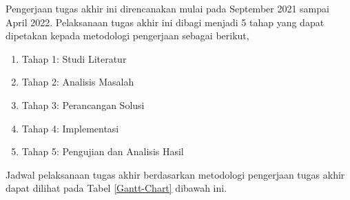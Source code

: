  Pengerjaan tugas akhir ini direncanakan mulai pada September 2021 sampai April 2022. Pelaksanaan tugas akhir ini dibagi menjadi 5 tahap yang dapat dipetakan kepada metodologi pengerjaan sebagai berikut,
 \begin{enumerate}
	     \item Tahap 1: Studi Literatur
	     \item Tahap 2: Analisis Masalah
	     \item Tahap 3: Perancangan Solusi
	     \item Tahap 4: Implementasi
	     \item Tahap 5: Pengujian dan Analisis Hasil
	 \end{enumerate}
 Jadwal pelaksanaan tugas akhir berdasarkan metodologi pengerjaan tugas akhir dapat dilihat pada Tabel \ref{Gantt-Chart} dibawah ini.
 \begin{table}[htb]
	 \centering
	 \caption{Gantt Chart jadwal pelaksanaan tugas akhir}
	 \label{Gantt-Chart}
	 \end{table}

